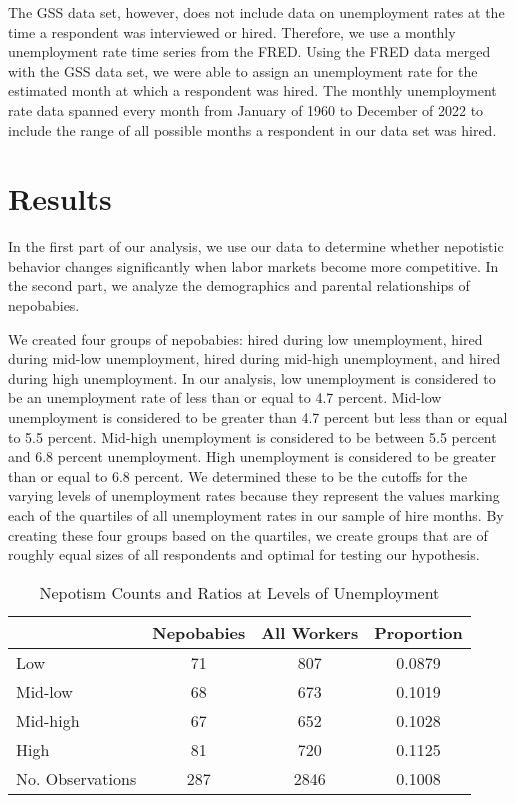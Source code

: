 \documentclass[12pt]{article}
\begin{document}
The GSS data set, however, does not include data on unemployment rates at the time a respondent was interviewed or hired. Therefore, we use a monthly unemployment rate time series from the FRED. Using the FRED data merged with the GSS data set, we were able to assign an unemployment rate for the estimated month at which a respondent was hired. The monthly unemployment rate data spanned every month from January of 1960 to December of 2022 to include the range of all possible months a respondent in our data set was hired. 


\section{Results}
\label{sec:result}

In the first part of our analysis, we use our data to determine whether nepotistic behavior changes significantly when labor markets become more competitive. In the second part, we analyze the demographics and parental relationships of nepobabies.

We created four groups of nepobabies: hired during low unemployment, hired during mid-low unemployment, hired during mid-high unemployment, and hired during high unemployment. In our analysis, low unemployment is considered to be an unemployment rate of less than or equal to 4.7 percent. Mid-low unemployment is considered to be greater than 4.7 percent but less than or equal to 5.5 percent. Mid-high unemployment is considered to be between 5.5 percent and 6.8 percent unemployment. High unemployment is considered to be greater than or equal to 6.8 percent. We determined these to be the cutoffs for the varying levels of unemployment rates because they represent the values marking each of the quartiles of all unemployment rates in our sample of hire months. By creating these four groups based on the quartiles, we create groups that are of roughly equal sizes of all respondents and optimal for testing our hypothesis.

\begin{table}[ht]
\centering
\begin{tabular}{l|cc|c}
 & Nepobabies & All Workers & Proportion \\ 
\hline 
Low & 71 & 807 & 0.0879 \\
Mid-low & 68 & 673 & 0.1019 \\
Mid-high & 67 & 652 & 0.1028 \\
High & 81 & 720 & 0.1125 \\
\hline 
No. Observations & 287 & 2846 & 0.1008 \\
\end{tabular}
\caption{Nepotism Counts and Ratios at Levels of Unemployment}
\label{tab:mytable}
\end{table}
\end{document}
